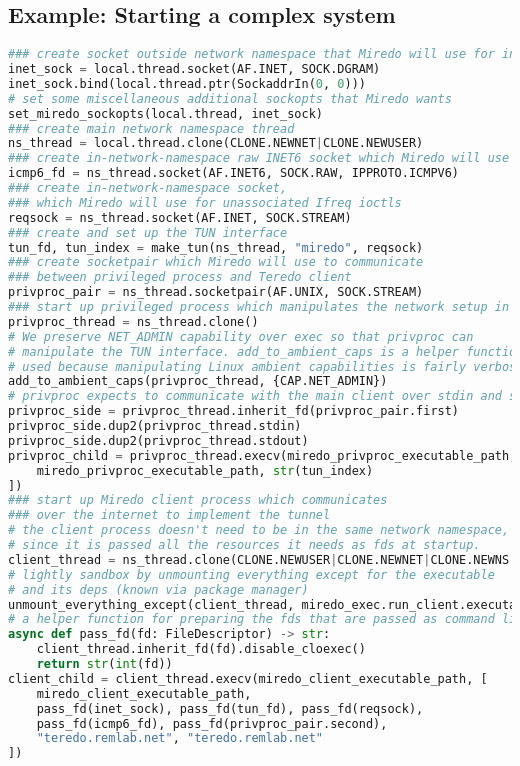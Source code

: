 \documentclass{acmart}
\begin{document}
\subsection{Example: Starting a complex system}
\begin{lstlisting}[float,language=Python,label={miredo},caption={Starting a complex system}]
### create socket outside network namespace that Miredo will use for internet access
inet_sock = local.thread.socket(AF.INET, SOCK.DGRAM)
inet_sock.bind(local.thread.ptr(SockaddrIn(0, 0)))
# set some miscellaneous additional sockopts that Miredo wants
set_miredo_sockopts(local.thread, inet_sock)
### create main network namespace thread
ns_thread = local.thread.clone(CLONE.NEWNET|CLONE.NEWUSER)
### create in-network-namespace raw INET6 socket which Miredo will use to relay pings
icmp6_fd = ns_thread.socket(AF.INET6, SOCK.RAW, IPPROTO.ICMPV6)
### create in-network-namespace socket,
### which Miredo will use for unassociated Ifreq ioctls
reqsock = ns_thread.socket(AF.INET, SOCK.STREAM)
### create and set up the TUN interface
tun_fd, tun_index = make_tun(ns_thread, "miredo", reqsock)
### create socketpair which Miredo will use to communicate
### between privileged process and Teredo client
privproc_pair = ns_thread.socketpair(AF.UNIX, SOCK.STREAM)
### start up privileged process which manipulates the network setup in the namespace
privproc_thread = ns_thread.clone()
# We preserve NET_ADMIN capability over exec so that privproc can
# manipulate the TUN interface. add_to_ambient_caps is a helper function
# used because manipulating Linux ambient capabilities is fairly verbose
add_to_ambient_caps(privproc_thread, {CAP.NET_ADMIN})
# privproc expects to communicate with the main client over stdin and stdout
privproc_side = privproc_thread.inherit_fd(privproc_pair.first)
privproc_side.dup2(privproc_thread.stdin)
privproc_side.dup2(privproc_thread.stdout)
privproc_child = privproc_thread.execv(miredo_privproc_executable_path, [
    miredo_privproc_executable_path, str(tun_index)
])
### start up Miredo client process which communicates
### over the internet to implement the tunnel
# the client process doesn't need to be in the same network namespace,
# since it is passed all the resources it needs as fds at startup.
client_thread = ns_thread.clone(CLONE.NEWUSER|CLONE.NEWNET|CLONE.NEWNS|CLONE.NEWPID)
# lightly sandbox by unmounting everything except for the executable
# and its deps (known via package manager)
unmount_everything_except(client_thread, miredo_exec.run_client.executable_path)
# a helper function for preparing the fds that are passed as command line arguments
async def pass_fd(fd: FileDescriptor) -> str:
    client_thread.inherit_fd(fd).disable_cloexec()
    return str(int(fd))
client_child = client_thread.execv(miredo_client_executable_path, [
    miredo_client_executable_path,
    pass_fd(inet_sock), pass_fd(tun_fd), pass_fd(reqsock),
    pass_fd(icmp6_fd), pass_fd(privproc_pair.second),
    "teredo.remlab.net", "teredo.remlab.net"
])
\end{lstlisting}
\end{document}
